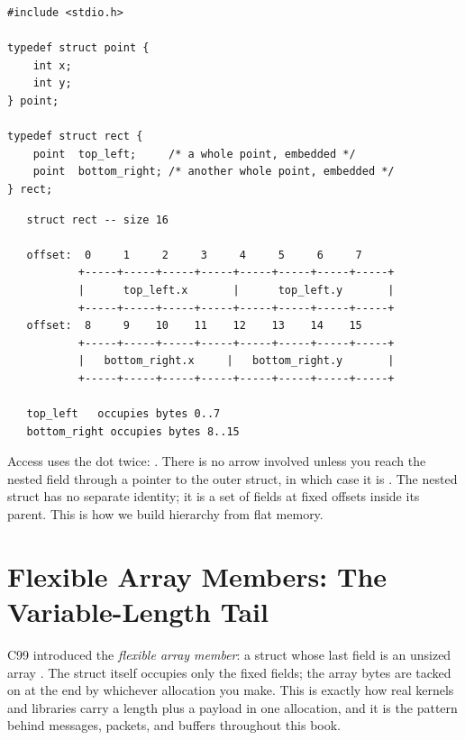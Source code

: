 \begin{lstlisting}[caption={A struct containing a struct.}]
#include <stdio.h>

typedef struct point {
    int x;
    int y;
} point;

typedef struct rect {
    point  top_left;     /* a whole point, embedded */
    point  bottom_right; /* another whole point, embedded */
} rect;
\end{lstlisting}

\begin{verbatim}
   struct rect -- size 16

   offset:  0     1     2     3     4     5     6     7
           +-----+-----+-----+-----+-----+-----+-----+-----+
           |      top_left.x       |      top_left.y       |
           +-----+-----+-----+-----+-----+-----+-----+-----+
   offset:  8     9    10    11    12    13    14    15
           +-----+-----+-----+-----+-----+-----+-----+-----+
           |   bottom_right.x     |   bottom_right.y       |
           +-----+-----+-----+-----+-----+-----+-----+-----+

   top_left   occupies bytes 0..7
   bottom_right occupies bytes 8..15
\end{verbatim}

Access uses the dot twice: . There is no arrow
involved unless you reach the nested field through a pointer to the
outer struct, in which case it is . The nested
struct has no separate identity; it is a set of fields at fixed offsets
inside its parent. This is how we build hierarchy from flat memory.

\section{Flexible Array Members: The Variable-Length Tail}

C99 introduced the \emph{flexible array member}: a struct whose last
field is an unsized array . The struct itself occupies
only the fixed fields; the array bytes are tacked on at the end by
whichever allocation you make. This is exactly how real kernels and
libraries carry a length plus a payload in one allocation, and it is
the pattern behind messages, packets, and buffers throughout this book.

